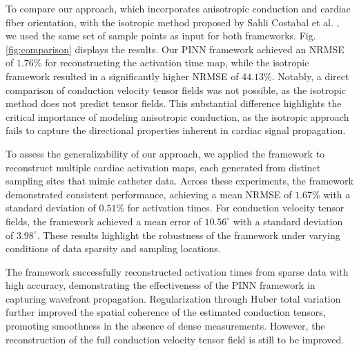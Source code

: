 To compare our approach, which incorporates anisotropic conduction and cardiac fiber orientation, with the isotropic method proposed by Sahli Costabal et al. \cite{SahliCostabal2020}, we used the same set of sample points as input for both frameworks. Fig. \ref{fig:comparison} displays the results. Our PINN framework achieved an NRMSE of $1.76\%$ for reconstructing the activation time map, while the isotropic framework resulted in a significantly higher NRMSE of $44.13\%$. Notably, a direct comparison of conduction velocity tensor fields was not possible, as the isotropic method does not predict tensor fields. This substantial difference highlights the critical importance of modeling anisotropic conduction, as the isotropic approach fails to capture the directional properties inherent in cardiac signal propagation.

To assess the generalizability of our approach, we applied the framework to reconstruct multiple cardiac activation maps, each generated from distinct sampling sites that mimic catheter data. Across these experiments, the framework demonstrated consistent performance, achieving a mean NRMSE of $1.67\%$ with a standard deviation of $0.51\%$ for activation times. For conduction velocity tensor fields, the framework achieved a mean error of $10.56^\circ$ with a standard deviation of $3.98^\circ$. These results highlight the robustness of the framework under varying conditions of data sparsity and sampling locations.

The framework successfully reconstructed activation times from sparse data with high accuracy, demonstrating the effectiveness of the PINN framework in capturing wavefront propagation. Regularization through Huber total variation further improved the spatial coherence of the estimated conduction tensors, promoting smoothness in the absence of dense measurements. However, the reconstruction of the full conduction velocity tensor field is still to be improved.
